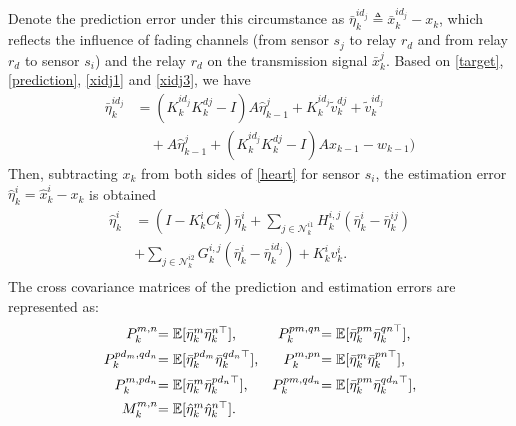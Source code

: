 \documentclass[twocolumn]{IEEEtran}
\begin{document}
Denote the prediction error under this circumstance as $\bar{\eta}_{k}^{id_j}\triangleq\bar{x}_{k}^{id_j}-x_{k}$, which reflects the influence of fading channels (from sensor $s_j$ to relay $r_d$ and from relay $r_d$ to sensor $s_{i}$) and the relay $r_d$ on the transmission signal $\bar{x}_{k}^{j}$. Based on \eqref{target}, \eqref{prediction}, \eqref{xidj1} and \eqref{xidj3}, we have
\begin{equation*}
\begin{split}
\bar{\eta}_{k}^{id_{j}}&=(K_{k}^{id_j}K_{k}^{dj}-I)A\hat{\eta}_{k-1}^{j}+K_{k}^{id_j}\tilde{v}_{k}^{dj}+\tilde{v}_{k}^{id_j}\\
&\quad+A\hat{\eta}_{k-1}^{j}+(K_{k}^{id_j}K_{k}^{dj}-I)Ax_{k-1}-w_{k-1})
\end{split}
\end{equation*}
Then, subtracting $x_{k}$ from both sides of \eqref{heart} for sensor $s_{i}$, the estimation error $\hat{\eta}_{k}^{i}=\hat{x}_{k}^{i}-x_{k}$ is obtained
\begin{equation*}
\begin{split}
\hat{\eta}_{k}^{i}&=(I-K_{k}^{i}C_{k}^{i})\bar{\eta}_{k}^{i}+\sum_{j\in\mathcal{N}_{k}^{i1}}H_{k}^{i,j}(\bar{\eta}_{k}^{i}-\bar{\eta}_{k}^{ij})\\
\quad&+\sum_{j\in\mathcal{N}_{k}^{i2}}G_{k}^{i,j}(\bar{\eta}_{k}^{i}-\bar{\eta}_{k}^{id_j})+K_{k}^{i}v_{k}^{i}\text{.}\\
\end{split}
\end{equation*}
The cross covariance matrices of the prediction and estimation errors are represented as:
\begin{equation}\label{covariancedef}
\begin{array}{r@{\hspace{0pt}}lr@{\hspace{0pt}}l}
\vspace{0.5em}
P_{k}^{m,n}&=\mathbb{E}[\bar{\eta}_{k}^{m}\bar{\eta}_{k}^{n\top}]\text{,} 
&P_{k}^{pm,qn}&=\mathbb{E}[\bar{\eta}_{k}^{pm}\bar{\eta}_{k}^{qn\top}]\text{,}\\
\vspace{0.5em}
P_{k}^{pd_m,qd_n}&=\mathbb{E}[\bar{\eta}_{k}^{pd_m}\bar{\eta}_{k}^{qd_n\top}]\text{,}
&P_{k}^{m,pn}&=\mathbb{E}[\bar{\eta}_{k}^{m}\bar{\eta}_{k}^{pn\top}]\text{,}\\
\vspace{0.5em}
P_{k}^{m,pd_n}&=\mathbb{E}[\bar{\eta}_{k}^{m}\bar{\eta}_{k}^{pd_n\top}]\text{,}
&P_{k}^{pm,qd_n}&=\mathbb{E}[\bar{\eta}_{k}^{pm}\bar{\eta}_{k}^{qd_n\top}]\text{,}\\
\vspace{0.5em}
M_{k}^{m,n}&=\mathbb{E}[\hat{\eta}_{k}^{m}\hat{\eta}_{k}^{n\top}]\text{.}&&
\end{array}   
\end{equation}
\end{document}
